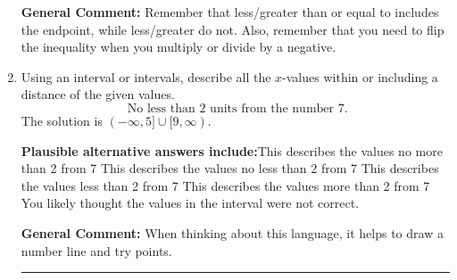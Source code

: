 \documentclass{extbook}[14pt]
\newcommand{\litem}[1]{\item #1

\rule{\textwidth}{0.4pt}}
\begin{document}
\begin{enumerate}
{\textbf{General Comment:} Remember that less/greater than or equal to includes the endpoint, while less/greater do not. Also, remember that you need to flip the inequality when you multiply or divide by a negative.
}
\litem{
Using an interval or intervals, describe all the $x$-values within or including a distance of the given values.
\[ \text{ No less than } 2 \text{ units from the number } 7. \]The solution is \( (-\infty, 5] \cup [9, \infty) \).\begin{enumerate}[label=\Alph*.]
\textbf{Plausible alternative answers include:}This describes the values no more than 2 from 7
This describes the values no less than 2 from 7
This describes the values less than 2 from 7
This describes the values more than 2 from 7
You likely thought the values in the interval were not correct.
\end{enumerate}

\textbf{General Comment:} When thinking about this language, it helps to draw a number line and try points.
}
\end{enumerate}
\end{document}
